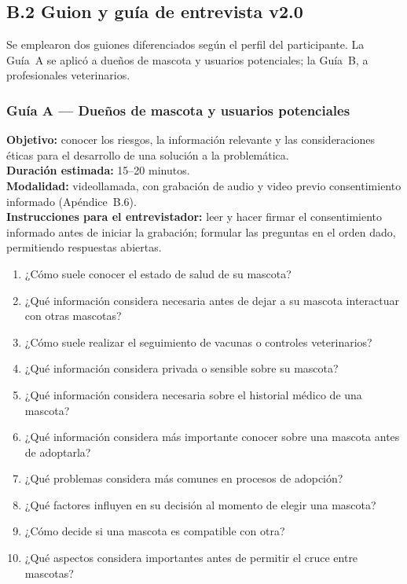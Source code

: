 \documentclass[journal,onecolumn]{IEEEtran}
\begin{document}
	\subsection*{B.2 Guion y guía de entrevista v2.0}
	
	Se emplearon dos guiones diferenciados según el perfil del participante. La
	Guía~A se aplicó a dueños de mascota y usuarios potenciales; la Guía~B, a
	profesionales veterinarios.
	
	\subsubsection*{Guía A --- Dueños de mascota y usuarios potenciales}
	
	\textbf{Objetivo:} conocer los riesgos, la información relevante y las
	consideraciones éticas para el desarrollo de una solución a la problemática.\\
	\textbf{Duración estimada:} 15--20 minutos.\\
	\textbf{Modalidad:} videollamada, con grabación de audio y video previo
	consentimiento informado (Apéndice~B.6).\\
	\textbf{Instrucciones para el entrevistador:} leer y hacer firmar el
	consentimiento informado antes de iniciar la grabación; formular las preguntas en
	el orden dado, permitiendo respuestas abiertas.
	
	\begin{enumerate}[leftmargin=*, itemsep=1pt]
		\item ¿Cómo suele conocer el estado de salud de su mascota?
		\item ¿Qué información considera necesaria antes de dejar a su mascota interactuar con otras mascotas?
		\item ¿Cómo suele realizar el seguimiento de vacunas o controles veterinarios?
		\item ¿Qué información considera privada o sensible sobre su mascota?
		\item ¿Qué información considera necesaria sobre el historial médico de una mascota?
		\item ¿Qué información considera más importante conocer sobre una mascota antes de adoptarla?
		\item ¿Qué problemas considera más comunes en procesos de adopción?
		\item ¿Qué factores influyen en su decisión al momento de elegir una mascota?
		\item ¿Cómo decide si una mascota es compatible con otra?
		\item ¿Qué aspectos considera importantes antes de permitir el cruce entre mascotas?
	\end{enumerate}
	
\end{document}
